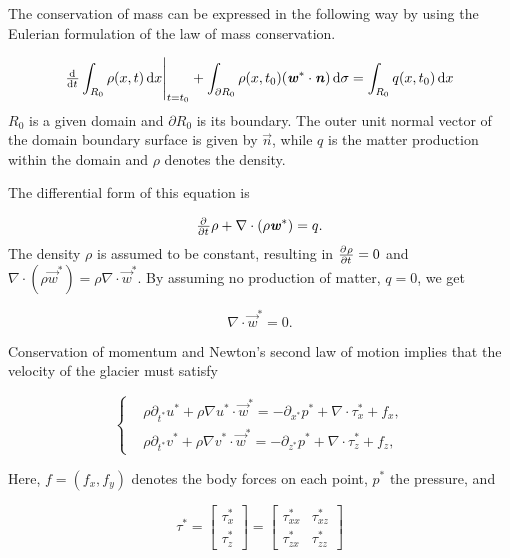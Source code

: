 The conservation of mass can be expressed in the following way by using the Eulerian formulation of the law of mass conservation. 

\begin{equation}
  \eval{\od{}{t} \int_{R_0} \rho(x, t) \dif{x}}_{t = t_0} + \int_{\partial R_0} \rho(x, t_0) (\vec{w}^* \cdot \vec{n}) \dif{\sigma} = \int_{R_0} q(x, t_0) \dif{x}
\end{equation}
$R_0$ is a given domain and $\partial R_0$ is its boundary. The outer unit normal vector of the domain boundary surface is given by $\vec{n}$, while $q$ is the matter production within the domain and $\rho$ denotes the density.

The differential form of this equation is

\begin{equation}
  \pd{}{t} \rho + \nabla \cdot (\rho \vec{w}^*) = q.
  \label{eq:conservation_of_matter_interior}
\end{equation}
The density $\rho$ is assumed to be constant, resulting in $\pd{\rho}{t} = 0$ and $\nabla \cdot (\rho \vec{w}^*) = \rho \nabla \cdot \vec{w}^*$. By assuming no production of matter, $q = 0$, we get

\begin{equation} \label{eq:velocity-divergence}
  \nabla \cdot \vec{w}^* = 0.
\end{equation}

Conservation of momentum and Newton's second law of motion implies that the velocity of the glacier must satisfy

\begin{equation} \label{eq:momentum-conservation}
  \begin{cases}
    &\rho \partial_{t^*} u^* + \rho \nabla u^* \cdot \vec{w}^* = -\partial_{x^*} p^* + \nabla \cdot \tau_x^* + f_x, \\
    &\rho \partial_{t^*} v^* + \rho \nabla v^* \cdot \vec{w}^* = -\partial_{z^*} p^* + \nabla \cdot \tau_z^* + f_z,
  \end{cases}
\end{equation}

Here, $f = (f_x, f_y)$ denotes the body forces on each point, $p^*$ the pressure, and

\begin{equation}
  \tau^* = \begin{bmatrix} \tau_x^* \\ \tau_z^* \end{bmatrix} = \begin{bmatrix} \tau_{xx}^* & \tau_{xz}^* \\ \tau_{zx}^* & \tau_{zz}^* \end{bmatrix}
\end{equation}

